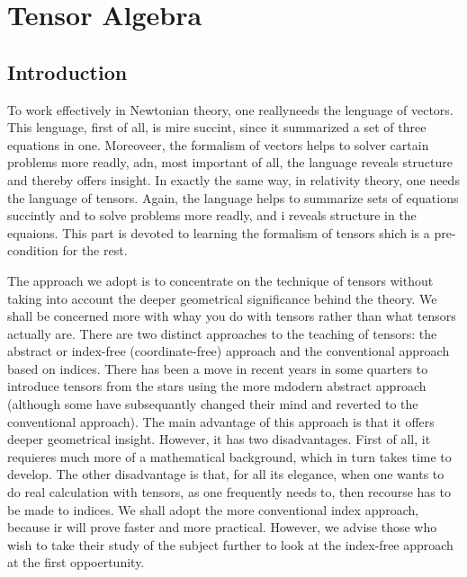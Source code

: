 \chapter{Tensor Algebra}
\section{Introduction}
To work effectively in Newtonian theory, one reallyneeds the lenguage of vectors. This lenguage, first of all, is mire succint, since it  summarized a set of three equations in one. Moreoveer, the formalism of vectors helps to solver cartain problems more readly, adn, most important of all, the language reveals structure and thereby offers insight. In exactly the same way, in relativity theory, one needs the language of tensors. Again, the language helps to summarize sets of equations succintly and to solve problems more readly, and i reveals structure in the equaions. This part is devoted to learning the formalism of tensors shich is a pre-condition for the rest.

The approach we adopt is to concentrate on the technique of tensors without taking into account the deeper geometrical significance behind the theory. We shall be concerned more with whay you do with tensors rather than what tensors actually are. There are two distinct approaches to the teaching of tensors: the abstract or index-free (coordinate-free) approach and the conventional approach based on indices. There has been a move in recent years in some quarters to introduce tensors from the stars using the more mdodern abstract approach (although some have subsequantly changed their mind and reverted to the conventional approach). The main advantage of this approach is that it offers deeper geometrical insight. However, it has two disadvantages. First of all, it requieres much more of a mathematical background, which in turn takes time to develop. The other disadvantage is that, for all its elegance, when one wants to do real calculation with tensors, as one frequently needs to, then recourse has to be made to indices. We shall adopt the more conventional index approach, because ir will prove faster and more practical. However, we advise those who wish to take their study of the subject further to look at the index-free approach at the first oppoertunity.
